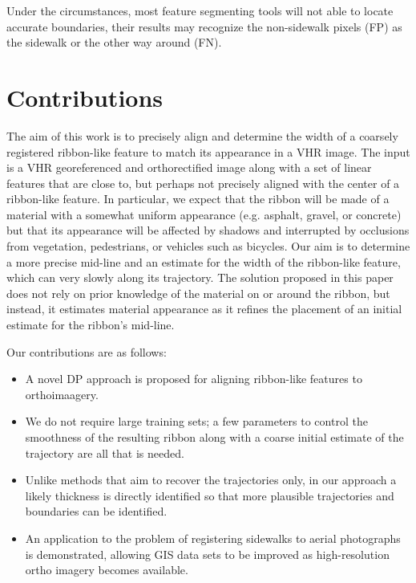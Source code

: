 Under the circumstances, most feature segmenting tools will not able to locate accurate boundaries, their results may recognize the non-sidewalk pixels (FP) as the sidewalk or the other way around (FN). 

\section{Contributions}

The aim of this work is to precisely align and determine the width of a coarsely registered ribbon-like feature to match its appearance in a \ac{VHR} image.
The input is a \ac{VHR} georeferenced and orthorectified image along with a set of linear features that are close to, but perhaps not precisely aligned with the center of a ribbon-like feature. 
In particular, we expect that the ribbon will be made of a material with a somewhat uniform appearance (e.g. asphalt, gravel, or concrete) but that its appearance will be affected by shadows and interrupted by occlusions from vegetation, pedestrians, or vehicles such as bicycles. 
Our aim is to determine a more precise mid-line and an estimate for the width of the ribbon-like feature, which can very slowly along its trajectory. 
The solution proposed in this paper does not rely on prior knowledge of the material on or around the ribbon, but instead, it estimates material appearance as it refines the placement of an initial estimate for the ribbon's mid-line.
	
	Our contributions are as follows:
	\begin{itemize}
		\item A novel \ac{DP} approach is proposed for aligning ribbon-like features to orthoimaagery.
		\item We do not require large training sets; a few parameters to control the smoothness of the resulting ribbon along with a coarse initial estimate of the trajectory are all that is needed.
		\item Unlike methods that aim to recover the trajectories only, in our approach a likely thickness is directly identified so that more plausible trajectories and boundaries can be identified.
		\item An application to the problem of registering sidewalks to aerial photographs is demonstrated, allowing \ac{GIS} data sets to be improved as high-resolution ortho imagery becomes available. 
	\end{itemize}